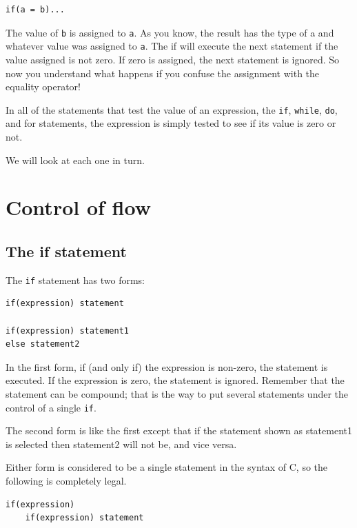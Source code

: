    \begin{Verbatim}
if(a = b)...
\end{Verbatim}

   The value of \texttt{b} is assigned to \texttt{a}. As you know,
    the result has the type of a and whatever value was assigned to
    \texttt{a}. The if will execute the next statement if the value
    assigned is not zero. If zero is assigned, the next statement is ignored.
    So now you understand what happens if you confuse the assignment with the
    equality operator!


   In all of the statements that test the value of an expression, the
    \texttt{if}, \texttt{while}, \texttt{do}, and for statements,
    the expression is simply tested to see if its value is zero or not.


   We will look at each one in turn.


  

 
        \section{Control of flow}
        

  

  \subsection{The if statement}
   

   The \texttt{if} statement has two forms:


   \begin{Verbatim}
if(expression) statement

if(expression) statement1
else statement2
\end{Verbatim}

   In the first form, if (and only if) the expression is
    non-zero, the statement is executed. If the
    expression is zero, the statement is ignored.
    Remember that the statement can be compound; that is the way to
    put several statements under the control of a single \texttt{if}.


   The second form is like the first except that if the statement shown as
    statement1 is selected then statement2 will not be,
    and vice versa.


   Either form is considered to be a single statement in the syntax
    of C, so the following is completely legal.


   \begin{Verbatim}
if(expression)
    if(expression) statement
\end{Verbatim}

